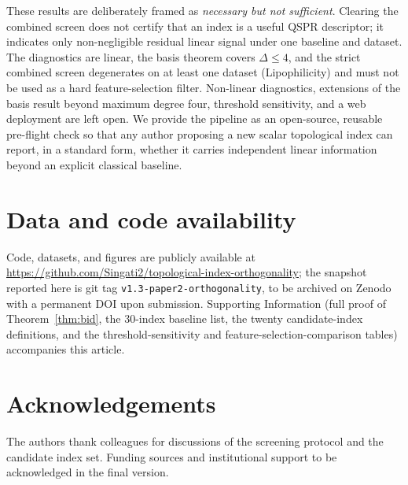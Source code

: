 \documentclass[11pt,a4paper]{article}
\theoremstyle{definition}
\begin{document}
These results are deliberately framed as \emph{necessary but not
sufficient}. Clearing the combined screen does not certify that an
index is a useful QSPR descriptor; it indicates only non-negligible
residual linear signal under one baseline and dataset. The
diagnostics are linear, the basis theorem covers $\Delta\le 4$, and
the strict combined screen degenerates on at least one dataset
(Lipophilicity) and must not be used as a hard feature-selection
filter. Non-linear diagnostics, extensions of the basis result
beyond maximum degree four, threshold sensitivity, and a web
deployment are left open. We provide the pipeline as an
open-source, reusable pre-flight check so that any author proposing
a new scalar topological index can report, in a standard form,
whether it carries independent linear information beyond an
explicit classical baseline.

\section*{Data and code availability}

Code, datasets, and figures are publicly available at
\url{https://github.com/Singati2/topological-index-orthogonality};
the snapshot reported here is git tag
\texttt{v1.3-paper2-orthogonality}, to be archived on Zenodo with a
permanent DOI upon submission. Supporting Information (full proof of
Theorem~\ref{thm:bid}, the $30$-index baseline list, the twenty
candidate-index definitions, and the threshold-sensitivity and
feature-selection-comparison tables) accompanies this article.

\section*{Acknowledgements}

The authors thank colleagues for discussions of the screening
protocol and the candidate index set. Funding sources and
institutional support to be acknowledged in the final version.
\end{document}
